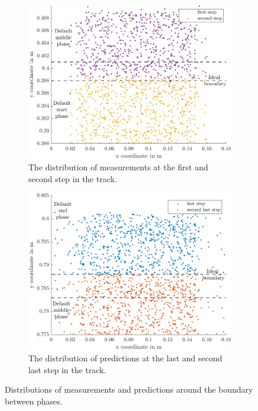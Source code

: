 \begin{figure}[htbp]
	\centering
	\begin{subfigure}[t]{0.45\textwidth}
		\includegraphics[width=\textwidth]{figures/Asso/range 1.png}
		\caption{The distribution of measurements at the first and second step in the track.}
	\end{subfigure}
	\quad
	\begin{subfigure}[t]{0.45\textwidth}
		\includegraphics[width=\textwidth]{figures/Asso/range 2.png}
		\caption{The distribution of predictions at the last and second last step in the track.}
	\end{subfigure}
	\caption{Distributions of measurements and predictions around the boundary between phases.}
	\label{phase}
\end{figure}

